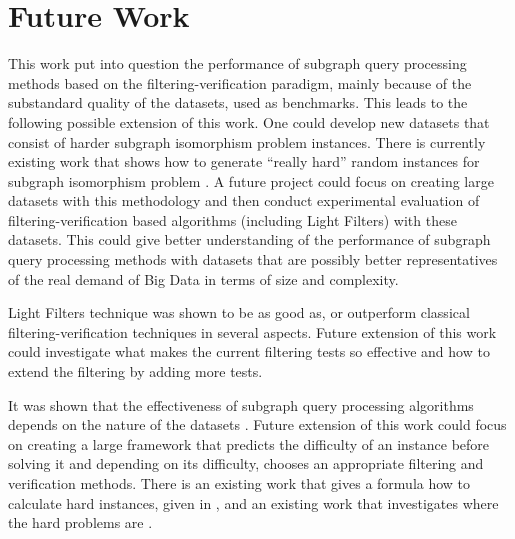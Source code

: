 \documentclass{l4proj}
\begin{document}
\section{Future Work}
This work put into question the performance of subgraph query processing methods based on the filtering-verification paradigm, mainly because of the substandard quality of the datasets, used as benchmarks. This leads to the following possible extension of this work. %
One could develop new datasets that consist of harder subgraph isomorphism problem instances. There is currently existing work that shows how to generate ``really hard'' random instances for subgraph isomorphism problem \cite{patrick:2015}. A future project could focus on creating large datasets with this methodology and then conduct experimental evaluation of filtering-verification based algorithms (including Light Filters) with these datasets. This could give better understanding of the performance of subgraph query processing methods with datasets that are possibly better representatives of the real demand of Big Data in terms of size and complexity.

Light Filters technique was shown to be as good as, or outperform classical filtering-verification techniques in several aspects. Future extension of this work could investigate what makes the current filtering tests so effective and how to extend the filtering by adding more tests.

It was shown that the effectiveness of subgraph query processing algorithms depends on the nature of the datasets \cite{CP2015}. Future extension of this work could focus on creating a large framework that predicts the difficulty of an instance before solving it and depending on its difficulty, chooses an appropriate filtering and verification methods. There is an existing work that gives a formula how to calculate hard instances, given in \cite{Gent:1996}, and an existing work that investigates where the hard problems are \cite{Cheeseman:1991}.




\printglossary
\printglossary[type=\acronymtype]
\end{document}
